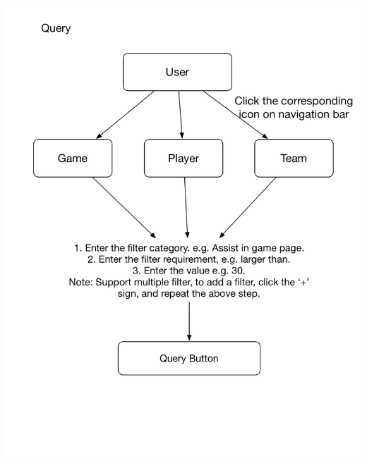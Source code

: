 \documentclass[a4paper,12pt]{article} %
\begin{document}
\begin{center}
\includegraphics[width=1\textwidth]{QueryChart}
\end{center}
\end{document}
